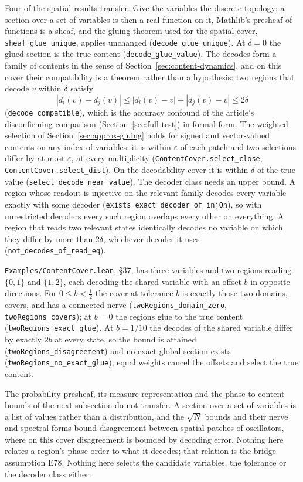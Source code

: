 \documentclass{article}
\begin{document}
Four of the spatial results transfer. Give the variables the discrete topology: a section over a set of variables is then a real function on it, Mathlib's presheaf of functions is a sheaf, and the gluing theorem used for the spatial cover, \nolinkurl{sheaf_glue_unique}, applies unchanged (\nolinkurl{decode_glue_unique}). At $\delta=0$ the glued section is the true content (\nolinkurl{decode_glue_value}). The decodes form a family of contents in the sense of Section~\ref{sec:content-dynamics}, and on this cover their compatibility is a theorem rather than a hypothesis: two regions that decode $v$ within $\delta$ satisfy
\[
|d_i(v)-d_j(v)|\leq|d_i(v)-v|+|d_j(v)-v|\leq2\delta
\]
(\nolinkurl{decode_compatible}), which is the accuracy confound of the article's disconfirming comparison (Section~\ref{sec:full-test}) in formal form. The weighted selection of Section~\ref{sec:approx-gluing} holds for signed and vector-valued contents on any index of variables: it is within $\varepsilon$ of each patch and two selections differ by at most $\varepsilon$, at every multiplicity (\nolinkurl{ContentCover.select_close}, \nolinkurl{ContentCover.select_dist}). On the decodability cover it is within $\delta$ of the true value (\nolinkurl{select_decode_near_value}). The decoder class needs an upper bound. A region whose readout is injective on the relevant family decodes every variable exactly with some decoder (\nolinkurl{exists_exact_decoder_of_injOn}), so with unrestricted decoders every such region overlaps every other on everything. A region that reads two relevant states identically decodes no variable on which they differ by more than $2\delta$, whichever decoder it uses (\nolinkurl{not_decodes_of_read_eq}).

\nolinkurl{Examples/ContentCover.lean}, \S37, has three variables and two regions reading $\{0,1\}$ and $\{1,2\}$, each decoding the shared variable with an offset $b$ in opposite directions. For $0\leq b<\tfrac12$ the cover at tolerance $b$ is exactly those two domains, covers, and has a connected nerve (\nolinkurl{twoRegions_domain_zero}, \nolinkurl{twoRegions_covers}); at $b=0$ the regions glue to the true content (\nolinkurl{twoRegions_exact_glue}). At $b=1/10$ the decodes of the shared variable differ by exactly $2b$ at every state, so the bound is attained (\nolinkurl{twoRegions_disagreement}) and no exact global section exists (\nolinkurl{twoRegions_no_exact_glue}); equal weights cancel the offsets and select the true content.

The probability presheaf, its measure representation and the phase-to-content bounds of the next subsection do not transfer. A section over a set of variables is a list of values rather than a distribution, and the $\sqrt N$ bounds and their nerve and spectral forms bound disagreement between spatial patches of oscillators, where on this cover disagreement is bounded by decoding error. Nothing here relates a region's phase order to what it decodes; that relation is the bridge assumption E78. Nothing here selects the candidate variables, the tolerance or the decoder class either.
\end{document}
